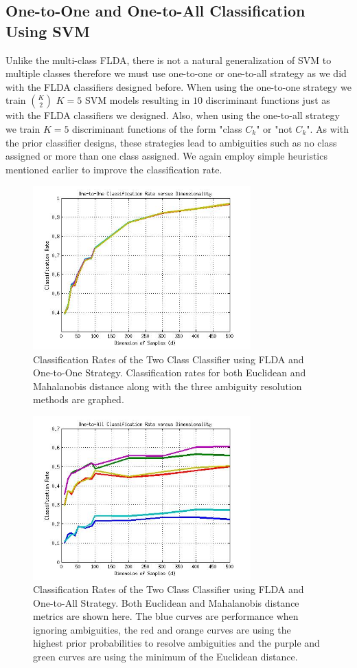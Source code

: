 \documentclass[journal]{IEEEtran}
\begin{document}
\subsection{One-to-One and One-to-All Classification Using SVM}
\par Unlike the multi-class FLDA, there is not a natural generalization of SVM to multiple classes therefore we must use one-to-one or one-to-all strategy as we did with the FLDA classifiers designed before. When using the one-to-one strategy we train \(K \choose 2\) \(K=5\) SVM models resulting in \(10\) discriminant functions just as with the FLDA classifiers we designed. Also, when using the one-to-all strategy we train \(K = 5\) discriminant functions of the form "class \(C_k\)" or "not \(C_k\)". As with the prior classifier designs, these strategies lead to ambiguities such as no class assigned or more than one class assigned. We again employ simple heuristics mentioned earlier to improve the classification rate.

\begin{figure}[!h]
\centering
\includegraphics[width=3.3in]{../images/one2one_rate.jpg}
\caption{Classification Rates of the Two Class Classifier using FLDA and One-to-One Strategy. Classification rates for both Euclidean and Mahalanobis distance along with the three ambiguity resolution methods are graphed.}
\label{fig:one2one_rate}
\end{figure}

\begin{figure}[!h]
\centering
\includegraphics[width=3.3in]{../images/one2all_rate.jpg}
\caption{Classification Rates of the Two Class Classifier using FLDA and One-to-All Strategy. Both Euclidean and Mahalanobis distance metrics are shown here. The blue curves are performance when ignoring ambiguities, the red and orange curves are using the highest prior probabilities to resolve ambiguities and the purple and green curves are using the minimum of the Euclidean distance.}
\label{fig:one2one_rate}
\end{figure}
\end{document}
